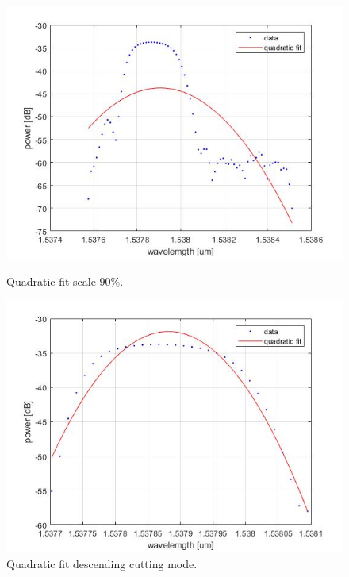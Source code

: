 \begin{figure}[!htb]
    \centering
    \includegraphics[scale=0.4]{img/quadratic_fit_scale_90.jpg}
    \caption{Quadratic fit scale 90\%.}
    \label{fig:quadratic_fit_scale}
  \endminipage\hfill
    \centering
    \includegraphics[scale=0.4]{img/quadratic_fit.jpg}
    \caption{Quadratic fit descending cutting mode.}
    \label{fig:quadratic_fit}
  \endminipage
\end{figure}

\newpage
{}
